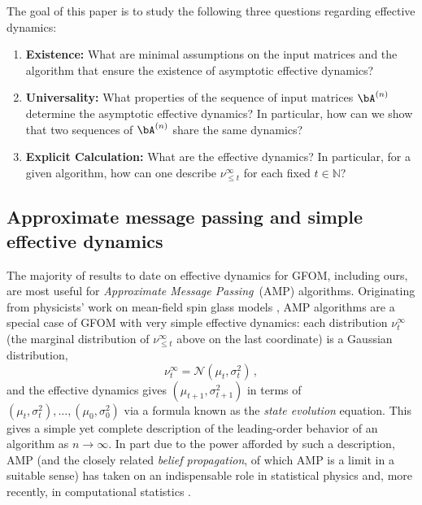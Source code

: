 The goal of this paper is to study the following three questions regarding effective dynamics:
\begin{enumerate}[1.]
    \item \textbf{Existence:} What are minimal assumptions on the input matrices and the algorithm that ensure the existence of asymptotic effective dynamics?
    \item \textbf{Universality:} What properties of the sequence of input matrices $\bA^{(n)}$ determine the asymptotic effective dynamics?
    In particular, how can we show that two sequences of $\bA^{(n)}$ share the same dynamics?
    \item \textbf{Explicit Calculation:} What are the effective dynamics? In particular, for a given algorithm, how can one describe $\nu_{\leq t}^{\infty}$ for each fixed $t \in \mathbb{N}$?
\end{enumerate}

\subsection{Approximate message passing and simple effective dynamics}

The majority of results to date on effective dynamics for GFOM, including ours, are most useful for \emph{Approximate Message Passing}~(AMP) algorithms. Originating from physicists' work on mean-field spin glass models \cite{mezard1987spinglasstheoryandbeyond,donoho2009message},
AMP algorithms are a special case of GFOM with very simple effective dynamics: each distribution $\nu_t^{\infty}$ (the marginal distribution of $\nu_{\leq t}^{\infty}$ above on the last coordinate) is a Gaussian distribution,
\[ \nu_t^{\infty} = \mathcal{N}(\mu_t, \sigma_t^2)\,, \]
and the effective dynamics gives $(\mu_{t+1}, \sigma_{t+1}^2)$ in terms of $(\mu_{t}, \sigma_{t}^2), \dots, (\mu_{0}, \sigma_0^2)$ via a formula known as the \emph{state evolution} equation.
This gives a simple yet complete description of the leading-order behavior of an algorithm as $n \to \infty$.
In part due to the power afforded by such a description, AMP (and the closely related \emph{belief propagation}, of which AMP is a limit in a suitable sense)
has taken on an indispensable role in statistical physics \cite{mezard1987spinglasstheoryandbeyond, MezardMontanari, charbonneau2023spin} and, more recently, in computational statistics \cite{zdeborova2016statistical, feng2022unifying}.

